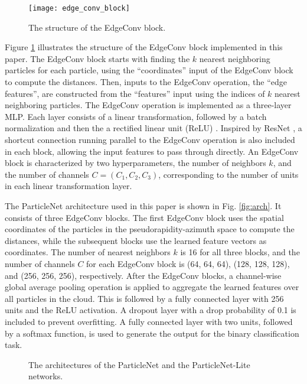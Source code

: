 \documentclass[aps,prd,longbibliography,reprint,amsmath,amssymb,amsfonts]{revtex4-1}
\begin{document}
\begin{figure}[htbp]
\centering
\texttt{[image: edge\_conv\_block]}
\caption{The structure of the EdgeConv block.}
\label{fig:block}
\end{figure}

Figure \ref{fig:block} illustrates the structure of the EdgeConv block implemented in this paper. The EdgeConv block starts with finding the $k$ nearest neighboring particles for each particle, using the ``coordinates'' input of the EdgeConv block to compute the distances. Then, inputs to the EdgeConv operation, the ``edge features'', are constructed from the ``features'' input using the indices of $k$ nearest neighboring particles. The EdgeConv operation is implemented as a three-layer MLP. Each layer consists of a linear transformation, followed by a batch normalization \cite{DBLP:journals/corr/IoffeS15} and then the a rectified linear unit (ReLU) \cite{glorot2011deep}. Inspired by ResNet \cite{he2016deep}, a shortcut connection running parallel to the EdgeConv operation is also included in each block, allowing the input features to pass through directly. An EdgeConv block is characterized by two hyperparameters, the number of neighbors $k$, and the number of channels $C=(C_1, C_2, C_3)$, corresponding to the number of units in each linear transformation layer.

The ParticleNet architecture used in this paper is shown in Fig. \ref{fig:arch}. It consists of three EdgeConv blocks. The first EdgeConv block uses the spatial coordinates of the particles in the pseudorapidity-azimuth space to compute the distances, while the subsequent blocks use the learned feature vectors as coordinates. The number of nearest neighbors $k$ is 16 for all three blocks, and the number of channels $C$ for each EdgeConv block is (64, 64, 64), (128, 128, 128), and (256, 256, 256), respectively. After the EdgeConv blocks, a channel-wise global average pooling operation is applied to aggregate the learned features over all particles in the cloud. This is followed by a fully connected layer with 256 units and the ReLU activation. A dropout layer \cite{srivastava2014dropout} with a drop probability of 0.1 is included to prevent overfitting. A fully connected layer with two units, followed by a softmax function, is used to generate the output for the binary classification task. 

\begin{figure}[htbp]
\centering
{}\hspace{10mm}
\caption{The architectures of the ParticleNet and the ParticleNet-Lite networks.}
\label{fig:networks}
\end{figure}
\end{document}
